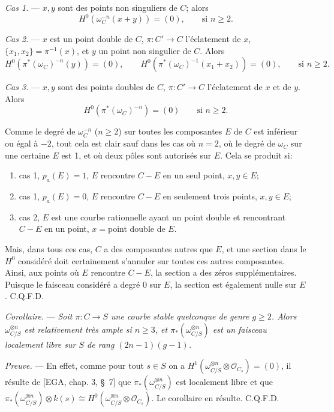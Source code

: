 \documentclass[10pt]{article}
\newcommand{\pa}{p_a}
\newcommand{\cO}{\mathcal O}
\begin{document}
\medskip
\noindent\textit{Cas 1.} --- $x,y$ sont des points non singuliers de $C$; alors
\[
H^0(\omega_C^{-n}(x+y))=(0),\qquad \text{si } n\geq 2.
\]

\medskip
\noindent\textit{Cas 2.} --- $x$ est un point double de $C$, $\pi:C'\to C$ l'éclatement de $x$, $\{x_1,x_2\}=\pi^{-1}(x)$, et $y$ un point non singulier de $C$. Alors
\[
H^0(\pi^*(\omega_C)^{-n}(y))=(0),\qquad H^0(\pi^*(\omega_C)^{-1}(x_1+x_2))=(0),\qquad \text{si } n\geq 2.
\]

\medskip
\noindent\textit{Cas 3.} --- $x,y$ sont des points doubles de $C$, $\pi:C'\to C$ l'éclatement de $x$ et de $y$. Alors
\[
H^0(\pi^*(\omega_C)^{-n})=(0)\qquad \text{si } n\geq 2.
\]

Comme le degré de $\omega_C^{-n}$ ($n\geq 2$) sur toutes les composantes $E$ de $C$ est inférieur ou égal à $-2$, tout cela est clair sauf dans les cas où $n=2$, où le degré de $\omega_C$ sur une certaine $E$ est 1, et où deux pôles sont autorisés sur $E$. Cela se produit si:
\begin{enumerate}[label=(\roman*)]
\item cas 1, $\pa(E)=1$, $E$ rencontre $C-E$ en un seul point, $x,y\in E$;
\item cas 1, $\pa(E)=0$, $E$ rencontre $C-E$ en seulement trois points, $x,y\in E$;
\item cas 2, $E$ est une courbe rationnelle ayant un point double et rencontrant $C-E$ en un point, $x={}$point double de $E$.
\end{enumerate}
Mais, dans tous ces cas, $C$ a des composantes autres que $E$, et une section dans le $H^0$ considéré doit certainement s'annuler sur toutes ces autres composantes. Ainsi, aux points où $E$ rencontre $C-E$, la section a des zéros supplémentaires. Puisque le faisceau considéré a degré 0 sur $E$, la section est également nulle sur $E$. C.Q.F.D.

\medskip
\noindent\textit{Corollaire.} --- \textit{Soit $\pi:C\to S$ une courbe stable quelconque de genre $g\geq 2$. Alors $\omega_{C/S}^{\otimes n}$ est relativement très ample si $n\geq 3$, et $\pi_*(\omega_{C/S}^{\otimes n})$ est un faisceau localement libre sur $S$ de rang $(2n-1)(g-1)$.}

\medskip
\noindent\textit{Preuve.} --- En effet, comme pour tout $s\in S$ on a $H^1(\omega_{C/S}^{\otimes n}\otimes \cO_{C_s})=(0)$, il résulte de [EGA, chap. 3, \S~7] que $\pi_*(\omega_{C/S}^{\otimes n})$ est localement libre et que $\pi_*(\omega_{C/S}^{\otimes n})\otimes k(s)\cong H^0(\omega_{C/S}^{\otimes n}\otimes \cO_{C_s})$. Le corollaire en résulte. C.Q.F.D.
\end{document}
